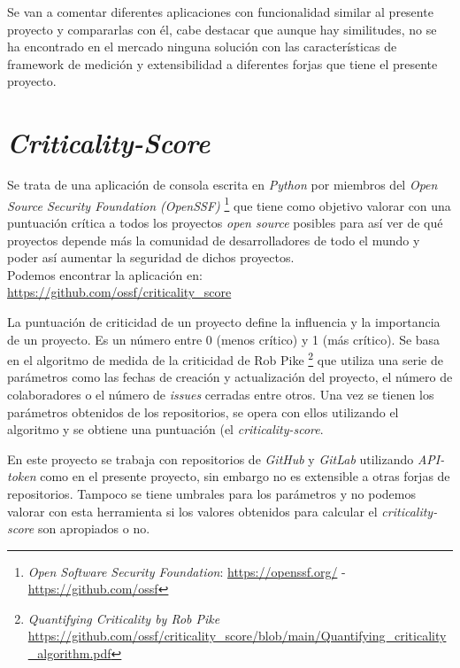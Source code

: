 
Se van a comentar diferentes aplicaciones con funcionalidad similar al presente proyecto y compararlas con él, cabe destacar que aunque hay similitudes, no se ha encontrado en el mercado ninguna solución con las características de framework de medición y extensibilidad a diferentes forjas que tiene el presente proyecto.

\section{\textit{Criticality-Score}}
Se trata de una aplicación de consola escrita en \textit{Python} por miembros del \textit{Open Source Security Foundation (OpenSSF)} \footnote{\textit{Open Software Security Foundation}:  \url{https://openssf.org/} - \url{https://github.com/ossf}} que tiene como objetivo valorar con una puntuación crítica a todos los proyectos \textit{open source} posibles para así ver de qué proyectos depende más la comunidad de desarrolladores de todo el mundo y poder así aumentar la seguridad de dichos proyectos.\\

Podemos encontrar la aplicación en:\\
\url{https://github.com/ossf/criticality_score}


La puntuación de criticidad de un proyecto define la influencia y la importancia de un proyecto. Es un número entre 0 (menos crítico) y 1 (más crítico). Se basa en el algoritmo de medida de la criticidad de Rob Pike  \footnote{\textit{Quantifying Criticality by Rob Pike}  \url{https://github.com/ossf/criticality_score/blob/main/Quantifying_criticality_algorithm.pdf}} que utiliza una serie de parámetros como las fechas de creación y actualización del proyecto, el número de colaboradores o el número de \textit{issues} cerradas entre otros. Una vez se tienen los parámetros obtenidos de los repositorios, se opera con ellos utilizando el algoritmo y se obtiene una puntuación (el \textit{criticality-score}.

En este proyecto se trabaja con repositorios de \textit{GitHub} y \textit{GitLab} utilizando \textit{API-token} como en el presente proyecto, sin embargo no es extensible a otras forjas de repositorios. Tampoco se tiene umbrales para los parámetros y no podemos valorar con esta herramienta si los valores obtenidos para calcular el \textit{criticality-score} son apropiados o no.


